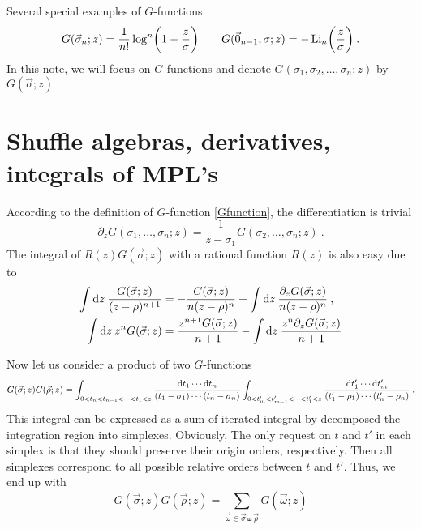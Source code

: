 \documentclass[12pt]{article}
\begin{document}
Several special examples of $G$-functions
\begin{equation}
    G(\vec{\sigma}_{n};z) = \frac{1}{n!}\log^{n}\biggl(1-\frac{z}{\sigma}\biggr) \qquad
    G(\vec{0}_{n-1},\sigma;z) = -\operatorname{Li}_{n}\biggl(\frac{z}{\sigma}\biggr)  \:.
\end{equation}
In this note, we will focus on $G$-functions and denote $G(\sigma_{1},\sigma_{2},\ldots,\sigma_{n};z)$ by $G(\vec{\sigma};z)$


\section{Shuffle algebras, derivatives, integrals of MPL's} \label{sec:2}

According to the definition of $G$-function \eqref{Gfunction}, the differentiation is trivial
\begin{equation}
    \partial_{z}G(\sigma_{1},\ldots,\sigma_{n};z)=\frac{1}{z-\sigma_{1}} G(\sigma_{2},\ldots,\sigma_{n};z) \:.
\end{equation}
The integral of $R(z)G(\vec{\sigma};z)$ with a rational function $R(z)$ is also easy due to
\begin{align}
    \int \mathrm{d} z\:\frac{G(\vec{\sigma};z)}{(z-\rho)^{n+1}} &= -\frac{G(\vec{\sigma};z)}{n(z-\rho)^{n}} 
    +\int \mathrm{d} z\:\frac{\partial_{z}G(\vec{\sigma};z)}{n(z-\rho)^{n}} \:,  \\
    \int \mathrm{d} z\: z^{n} G(\vec{\sigma};z) &= \frac{z^{n+1}G(\vec{\sigma};z)}{n+1} 
    -\int\mathrm{d} z\: \frac{z^{n}\partial_{z}G(\vec{\sigma};z)}{n+1} 
\end{align}

Now let us consider a product of two $G$-functions
\begin{align*}
    G(\vec{\sigma};z)G(\vec{\rho};z)= 
    \int_{0<t_{n}<t_{n-1}<\cdots<t_{1}<z}\frac{\mathrm{d} t_{1} \cdots \mathrm{d} t_{n} }{(t_{1}-\sigma_{1})\cdots (t_{n}-\sigma_{n})}
    \int_{0<t'_{m}<t'_{m-1}<\cdots<t'_{1}<z}\frac{\mathrm{d} t'_{1} \cdots \mathrm{d} t'_{m} }{(t'_{1}-\rho_{1})\cdots (t'_{n}-\rho_{n})} \:.
\end{align*}
This integral can be expressed as a sum of iterated integral by decomposed the integration region into simplexes. Obviously, The only request on $t$ and $t'$ in each simplex is that they should preserve their origin orders, respectively. Then all simplexes correspond to all possible relative orders between $t$ and $t'$. Thus, we end up with
\begin{equation}
    G(\vec{\sigma};z)G(\vec{\rho};z)= \sum_{\vec{\omega}\in \vec{\sigma}\shuffle \vec{\rho} } G(\vec{\omega};z)
\end{equation}  
\end{document}

